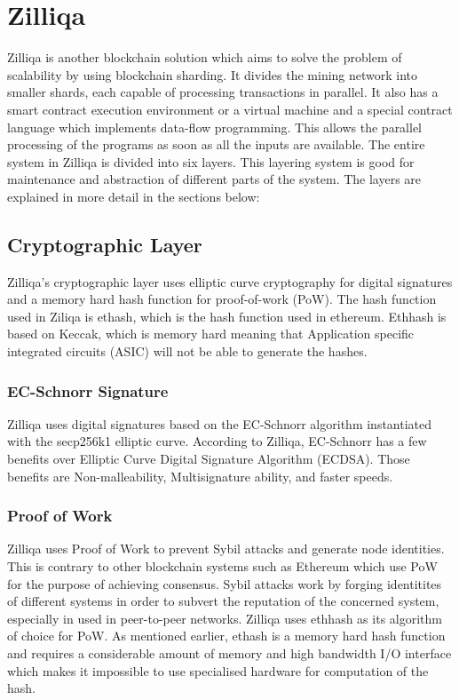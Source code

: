 \documentclass[a4paper,twoside,phd]{BYUPhys}
\begin{document}
\section{Zilliqa}
Zilliqa is another blockchain solution which aims to solve the problem of scalability by using blockchain sharding. It divides the mining network into smaller shards, each capable of processing transactions in parallel. It also has a smart contract execution environment or a virtual machine and a special contract language which implements data-flow programming. This allows the parallel processing of the programs as soon as all the inputs are available. The entire system in Zilliqa is divided into six layers. This layering system is good for maintenance and abstraction of different parts of the system. The layers are explained in more detail in the sections below:

\subsection{Cryptographic Layer}
Zilliqa's cryptographic layer uses elliptic curve cryptography for digital signatures and a memory hard hash function for proof-of-work (PoW). The hash function used in Ziliqa is ethash, which is the hash function used in ethereum. Ethhash is based on Keccak, which is memory hard meaning that Application specific integrated circuits (ASIC) will not be able to generate the hashes. 
\subsubsection{EC-Schnorr Signature}
Zilliqa uses digital signatures based on the EC-Schnorr algorithm instantiated with the secp256k1 elliptic curve. According to Zilliqa, EC-Schnorr has a few benefits over Elliptic Curve Digital Signature Algorithm (ECDSA). Those benefits are Non-malleability, Multisignature ability, and faster speeds. 

\subsubsection{Proof of Work}
Zilliqa uses Proof of Work to prevent Sybil attacks and generate node identities. This is contrary to other blockchain systems such as Ethereum which use PoW for the purpose of achieving consensus. Sybil attacks work by forging identitites of different systems in order to subvert the reputation of the concerned system, especially in used in peer-to-peer networks. Zilliqa uses ethhash as its algorithm of choice for PoW. As mentioned earlier, ethash is a memory hard hash function and requires a considerable amount of memory and high bandwidth I/O interface which makes it impossible to use specialised hardware for computation of the hash.
\end{document}
